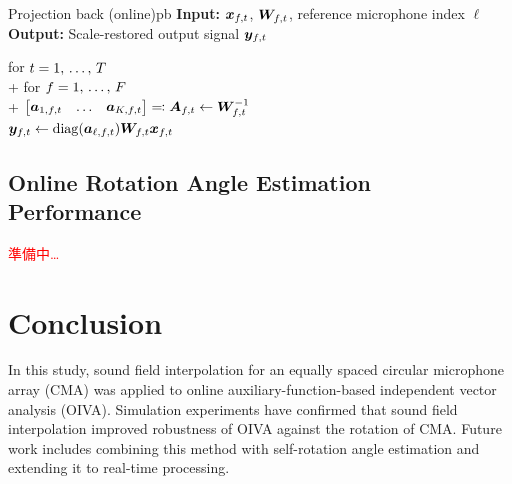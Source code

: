 \documentclass[sip,biber]{now-journal}
\newcommand{\todo}[1]{\textcolor{red}{#1}}
\begin{document}
\begin{algorithm}{Projection back (online)}{pb}
  \textbf{Input:} $\Obs _{\ft}$, $\Demix _{\ft}$, reference microphone index $\ell$\\
  \textbf{Output:} Scale-restored output signal $\Est _{\ft}$
  \begin{pseudo}
    for $t = 1,\, \dots,\, T$ \\+
      for $f = 1,\, \dots,\, F$ \\+
        $\begin{bmatrix} \steer _{1,\ft} & \dots & \steer _{\Mic,\ft} \end{bmatrix} \eqqcolon \Steer _{\ft} \gets \Demix _{\ft} ^{-1}$ \\
        $\Est _{\ft} \gets \mathrm{diag}(\steer _{\ell,\ft}) \Demix _{\ft} \Obs _{\ft}$
  \end{pseudo}
\end{algorithm}

\subsection{Online Rotation Angle Estimation Performance}
\todo{準備中…}

\section{Conclusion}\label{sec:conclusion}
In this study, sound field interpolation for an equally spaced circular microphone array (CMA) was applied to online auxiliary-function-based independent vector analysis (OIVA).
Simulation experiments have confirmed that sound field interpolation improved robustness of OIVA against the rotation of CMA.
Future work includes combining this method with self-rotation angle estimation \cite{Lian:2021:APSIPA} and extending it to real-time processing.
\end{document}
